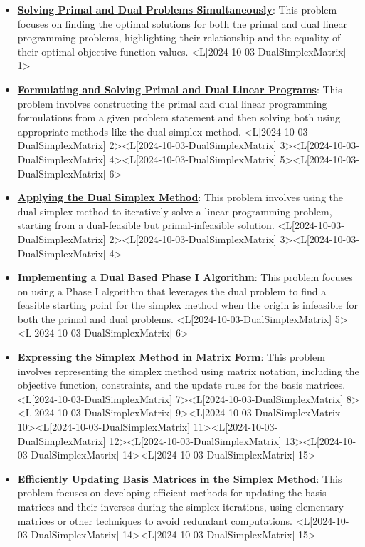 \documentclass{article}%
\begin{document}
\begin{itemize}[[leftmargin=*]]%
\item \href{https://www.math.purdue.edu/~yipn/421/2024-10-03-DualSimplexMatrix.pdf#page=1}{\textbf{Solving Primal and Dual Problems Simultaneously}}: This problem focuses on finding the optimal solutions for both the primal and dual linear programming problems, highlighting their relationship and the equality of their optimal objective function values. <L[2024-10-03-DualSimplexMatrix] 1>%
\item \href{https://www.math.purdue.edu/~yipn/421/2024-10-03-DualSimplexMatrix.pdf#page=2}{\textbf{Formulating and Solving Primal and Dual Linear Programs}}: This problem involves constructing the primal and dual linear programming formulations from a given problem statement and then solving both using appropriate methods like the dual simplex method. <L[2024-10-03-DualSimplexMatrix] 2><L[2024-10-03-DualSimplexMatrix] 3><L[2024-10-03-DualSimplexMatrix] 4><L[2024-10-03-DualSimplexMatrix] 5><L[2024-10-03-DualSimplexMatrix] 6>%
\item \href{https://www.math.purdue.edu/~yipn/421/2024-10-03-DualSimplexMatrix.pdf#page=2}{\textbf{Applying the Dual Simplex Method}}: This problem involves using the dual simplex method to iteratively solve a linear programming problem, starting from a dual-feasible but primal-infeasible solution. <L[2024-10-03-DualSimplexMatrix] 2><L[2024-10-03-DualSimplexMatrix] 3><L[2024-10-03-DualSimplexMatrix] 4>%
\item \href{https://www.math.purdue.edu/~yipn/421/2024-10-03-DualSimplexMatrix.pdf#page=5}{\textbf{Implementing a Dual Based Phase I Algorithm}}: This problem focuses on using a Phase I algorithm that leverages the dual problem to find a feasible starting point for the simplex method when the origin is infeasible for both the primal and dual problems. <L[2024-10-03-DualSimplexMatrix] 5><L[2024-10-03-DualSimplexMatrix] 6>%
\item \href{https://www.math.purdue.edu/~yipn/421/2024-10-03-DualSimplexMatrix.pdf#page=7}{\textbf{Expressing the Simplex Method in Matrix Form}}: This problem involves representing the simplex method using matrix notation, including the objective function, constraints, and the update rules for the basis matrices. <L[2024-10-03-DualSimplexMatrix] 7><L[2024-10-03-DualSimplexMatrix] 8><L[2024-10-03-DualSimplexMatrix] 9><L[2024-10-03-DualSimplexMatrix] 10><L[2024-10-03-DualSimplexMatrix] 11><L[2024-10-03-DualSimplexMatrix] 12><L[2024-10-03-DualSimplexMatrix] 13><L[2024-10-03-DualSimplexMatrix] 14><L[2024-10-03-DualSimplexMatrix] 15>%
\item \href{https://www.math.purdue.edu/~yipn/421/2024-10-03-DualSimplexMatrix.pdf#page=14}{\textbf{Efficiently Updating Basis Matrices in the Simplex Method}}: This problem focuses on developing efficient methods for updating the basis matrices and their inverses during the simplex iterations, using elementary matrices or other techniques to avoid redundant computations. <L[2024-10-03-DualSimplexMatrix] 14><L[2024-10-03-DualSimplexMatrix] 15>%
\end{itemize}%
\end{document}
